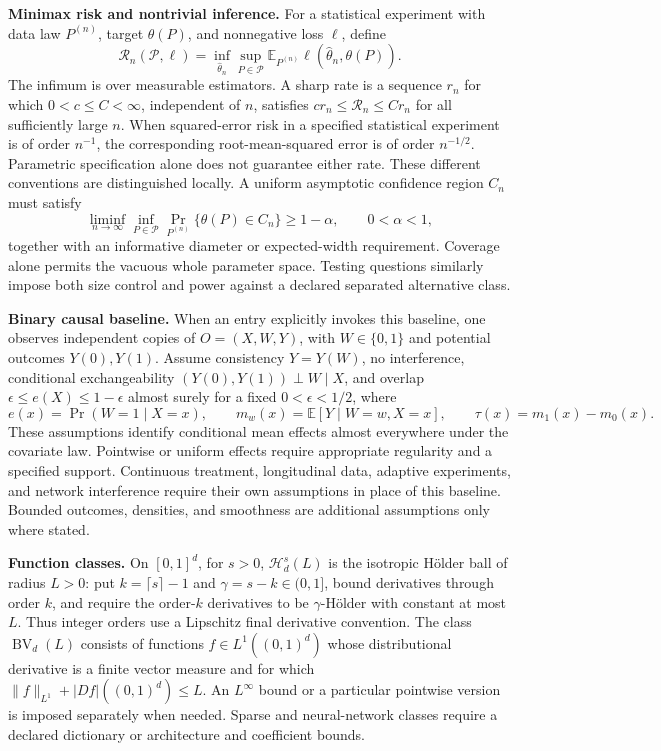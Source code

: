 \documentclass[11pt,a4paper]{article}
\newcommand{\E}{\mathbb E}
\begin{document}
\textbf{Minimax risk and nontrivial inference.}
For a statistical experiment with data law $P^{(n)}$, target $\theta(P)$,
and nonnegative loss $\ell$, define
\[
 \mathcal R_n(\mathcal P,\ell)
   =\inf_{\widehat\theta_n}\sup_{P\in\mathcal P}
      \E_{P^{(n)}}\ell(\widehat\theta_n,\theta(P)).
\]
The infimum is over measurable estimators. A sharp rate is a sequence
$r_n$ for which $0<c\leq C<\infty$, independent of $n$, satisfies
$c r_n\leq\mathcal R_n\leq C r_n$ for all sufficiently large $n$.
When squared-error risk in a specified statistical experiment is of order
$n^{-1}$, the corresponding root-mean-squared error is of order $n^{-1/2}$.
Parametric specification alone does not guarantee either rate.
These different conventions
are distinguished locally. A uniform asymptotic confidence region $C_n$
must satisfy
\[
 \liminf_{n\to\infty}\inf_{P\in\mathcal P}
     \Pr_{P^{(n)}}\{\theta(P)\in C_n\}\geq 1-\alpha,
 \qquad 0<\alpha<1,
\]
together with an informative diameter or expected-width requirement.
Coverage alone permits the vacuous whole parameter space. Testing questions
similarly impose both size control and power against a declared separated
alternative class.

\textbf{Binary causal baseline.}
When an entry explicitly invokes this baseline, one observes independent
copies of $O=(X,W,Y)$, with $W\in\{0,1\}$ and potential outcomes $Y(0),Y(1)$.
Assume consistency $Y=Y(W)$, no interference, conditional exchangeability
$(Y(0),Y(1))\perp W\mid X$, and overlap
$\epsilon\leq e(X)\leq1-\epsilon$ almost surely for a fixed
$0<\epsilon<1/2$, where
\[
 e(x)=\Pr(W=1\mid X=x),\qquad
 m_w(x)=\E[Y\mid W=w,X=x],\qquad
 \tau(x)=m_1(x)-m_0(x).
\]
These assumptions identify conditional mean effects almost everywhere
under the covariate law. Pointwise or uniform effects require appropriate
regularity and a specified support. Continuous treatment, longitudinal
data, adaptive experiments, and network interference require their own
assumptions in place of this baseline. Bounded outcomes, densities, and
smoothness are additional assumptions only where stated.

\textbf{Function classes.}
On $[0,1]^d$, for $s>0$, $\mathcal H_d^s(L)$ is the isotropic Hölder ball of radius
$L>0$: put $k=\lceil s\rceil-1$ and $\gamma=s-k\in(0,1]$, bound derivatives
through order $k$, and require the order-$k$ derivatives to be
$\gamma$-Hölder with constant at most $L$. Thus integer orders use a
Lipschitz final derivative convention. The class
$\operatorname{BV}_d(L)$ consists of functions $f\in L^1((0,1)^d)$ whose
distributional derivative is a finite vector measure and for which
$\|f\|_{L^1}+|Df|((0,1)^d)\leq L$.
An $L^\infty$ bound or a particular pointwise version is imposed separately
when needed. Sparse and neural-network classes require a declared
dictionary or architecture and coefficient bounds.
\end{document}
